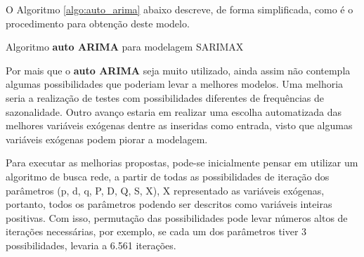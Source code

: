 O Algoritmo \ref{algo:auto_arima} abaixo descreve, de forma simplificada, como é o procedimento para obtenção deste modelo.

\begin{algorithm}[!htbp]
    
\caption{Algoritmo \textbf{auto ARIMA} para modelagem SARIMAX \cite{hyndman2007automatic}}
\label{algo:auto_arima}
\end{algorithm}

Por mais que o \textbf{auto ARIMA} seja muito utilizado, ainda assim não contempla algumas possibilidades que poderiam levar a melhores modelos. Uma melhoria seria a realização de testes com possibilidades diferentes de frequências de sazonalidade. Outro avanço estaria em realizar uma escolha automatizada das melhores variáveis exógenas dentre as inseridas como entrada, visto que algumas variáveis exógenas podem piorar a modelagem.

Para executar as melhorias propostas, pode-se inicialmente pensar em utilizar um algoritmo de busca rede, a partir de todas as possibilidades de iteração dos parâmetros (p, d, q, P, D, Q, S, X), X representado as variáveis exógenas, portanto, todos os parâmetros podendo ser descritos como variáveis inteiras positivas. Com isso, permutação das possibilidades pode levar números altos de iterações necessárias, por exemplo, se cada um dos parâmetros tiver 3 possibilidades, levaria a 6.561 iterações.

